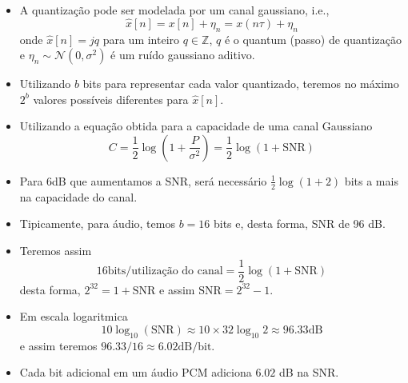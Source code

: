 \begin{frame}[allowframebreaks]
\begin{itemize}
  \item A quantização pode ser modelada por um canal gaussiano, i.e.,
	\begin{equation}
	\hat{x}[n] = x[n] + \eta_n = x(n\tau) + \eta_n
	\end{equation}
	onde $\hat{x}[n] = jq$ para um inteiro $q \in \mathbb{Z}$, $q$ é o quantum (passo) de quantização
	e $\eta_n \sim \mathcal{N}(0,\sigma^2)$ é um ruído gaussiano aditivo.
  \item Utilizando $b$ bits para representar cada valor quantizado, teremos no máximo $2^b$ valores 
	possíveis diferentes para $\hat{x}[n]$.
  \item Utilizando a equação obtida para a capacidade de uma canal Gaussiano
        \begin{equation}
        C = \frac{1}{2} \log \left( 1 + \frac{P}{\sigma^2} \right) = \frac{1}{2} \log (1 + \text{SNR})
        \end{equation}
  \item Para 6dB que aumentamos a SNR, será necessário $\frac{1}{2} \log (1 + 2)$ bits a mais na capacidade 
	do canal.
  \item Tipicamente, para áudio, temos $b=16$ bits e, desta forma, SNR de 96 dB.
  \item Teremos assim
	\begin{equation}
	16 \text{bits/utilização do canal} = \frac{1}{2} \log (1 + \text{SNR})
	\end{equation}
	desta forma, $2^{32} = 1 + \text{SNR}$ e assim $\text{SNR} = 2^{32} - 1$.
  \item Em escala logaritmica
	\begin{equation}
	10 \log_{10} (\text{SNR}) \approx 10 \times 32 \log_{10} 2 \approx 96.33 \text{dB}
	\end{equation}
	e assim teremos $96.33/16 \approx 6.02 \text{dB/bit}$.
  \item Cada bit adicional em um áudio PCM adiciona $6.02$ dB na SNR.
  \end{itemize}
\end{frame}


